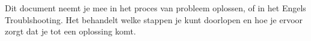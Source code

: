 Dit document neemt je mee in het proces van probleem oplossen, of in het Engels Troublshooting. Het behandelt welke stappen je kunt doorlopen en hoe je ervoor zorgt dat je tot een oplossing komt.
